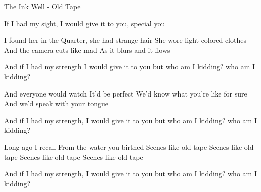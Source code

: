 The Ink Well - Old Tape

If I had my sight, I would give it to you, 
special you

I found her in the Quarter, she had strange hair
She wore light colored clothes
And the camera cuts like mad
As it blurs and it flows

And if I had my strength I would give it to you
but who am I kidding?
who am I kidding?

And everyone would watch
It'd be perfect
We'd know what you're like for sure
And we'd speak with your tongue

And if I had my strength, I would give it to you
but who am I kidding?
who am I kidding?

Long ago I recall
From the water you birthed
Scenes like old tape
Scenes like old tape
Scenes like old tape
Scenes like old tape

And if I had my strength, I would give it to you
but who am I kidding?
who am I kidding?

